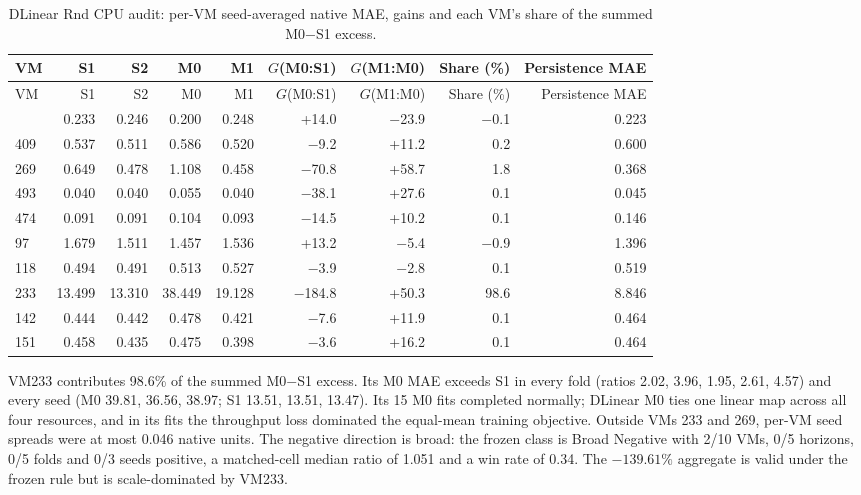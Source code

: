 \small
\setlength{\tabcolsep}{3pt}
\begin{longtable}{@{}lrrrrrrrr@{}}
\caption{DLinear Rnd CPU audit: per-VM seed-averaged native MAE, gains and each VM's share of the summed M0$-$S1 excess.}\label{tab:supp-t2-audit}\\
\toprule
VM & S1 & S2 & M0 & M1 & $G$(M0:S1) & $G$(M1:M0) & Share (\%) & Persistence MAE \\
\midrule
\endfirsthead
\toprule
VM & S1 & S2 & M0 & M1 & $G$(M0:S1) & $G$(M1:M0) & Share (\%) & Persistence MAE \\
\midrule
\endhead
\bottomrule
\endfoot
99 & 0.233 & 0.246 & 0.200 & 0.248 & +14.0 & $-$23.9 & $-$0.1 & 0.223 \\
409 & 0.537 & 0.511 & 0.586 & 0.520 & $-$9.2 & +11.2 & 0.2 & 0.600 \\
269 & 0.649 & 0.478 & 1.108 & 0.458 & $-$70.8 & +58.7 & 1.8 & 0.368 \\
493 & 0.040 & 0.040 & 0.055 & 0.040 & $-$38.1 & +27.6 & 0.1 & 0.045 \\
474 & 0.091 & 0.091 & 0.104 & 0.093 & $-$14.5 & +10.2 & 0.1 & 0.146 \\
97 & 1.679 & 1.511 & 1.457 & 1.536 & +13.2 & $-$5.4 & $-$0.9 & 1.396 \\
118 & 0.494 & 0.491 & 0.513 & 0.527 & $-$3.9 & $-$2.8 & 0.1 & 0.519 \\
233 & 13.499 & 13.310 & 38.449 & 19.128 & $-$184.8 & +50.3 & 98.6 & 8.846 \\
142 & 0.444 & 0.442 & 0.478 & 0.421 & $-$7.6 & +11.9 & 0.1 & 0.464 \\
151 & 0.458 & 0.435 & 0.475 & 0.398 & $-$3.6 & +16.2 & 0.1 & 0.464 \\
\end{longtable}
\normalsize\setlength{\tabcolsep}{4pt}

VM233 contributes 98.6\% of the summed M0$-$S1 excess. Its M0 MAE exceeds S1 in every fold (ratios 2.02, 3.96, 1.95, 2.61, 4.57) and every seed (M0 39.81, 36.56, 38.97; S1 13.51, 13.51, 13.47). Its 15 M0 fits completed normally; DLinear M0 ties one linear map across all four resources, and in its fits the throughput loss dominated the equal-mean training objective. Outside VMs 233 and 269, per-VM seed spreads were at most 0.046 native units. The negative direction is broad: the frozen class is Broad Negative with 2/10 VMs, 0/5 horizons, 0/5 folds and 0/3 seeds positive, a matched-cell median ratio of 1.051 and a win rate of 0.34. The $-139.61\%$ aggregate is valid under the frozen rule but is scale-dominated by VM233.

